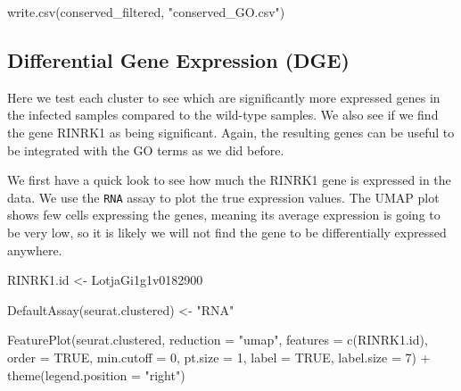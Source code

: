 \documentclass[
  letterpaper,
  DIV=11,
  numbers=noendperiod]{scrartcl}
\newenvironment{Shaded}{\begin{snugshade}}{\end{snugshade}}
\newcommand{\AttributeTok}[1]{\textcolor[rgb]{0.49,0.56,0.16}{#1}}
\newcommand{\ConstantTok}[1]{\textcolor[rgb]{0.53,0.00,0.00}{#1}}
\newcommand{\DecValTok}[1]{\textcolor[rgb]{0.25,0.63,0.44}{#1}}
\newcommand{\FunctionTok}[1]{\textcolor[rgb]{0.02,0.16,0.49}{#1}}
\newcommand{\NormalTok}[1]{\textcolor[rgb]{0.00,0.44,0.13}{#1}}
\newcommand{\OtherTok}[1]{\textcolor[rgb]{0.00,0.44,0.13}{#1}}
\newcommand{\SpecialCharTok}[1]{\textcolor[rgb]{0.25,0.44,0.63}{#1}}
\newcommand{\StringTok}[1]{\textcolor[rgb]{0.25,0.44,0.63}{#1}}
\begin{document}
\begin{Shaded}
\begin{Highlighting}[]
\FunctionTok{write.csv}\NormalTok{(conserved\_filtered, }\StringTok{"conserved\_GO.csv"}\NormalTok{)}
\end{Highlighting}
\end{Shaded}

\hypertarget{differential-gene-expression-dge}{%
\subsection{Differential Gene Expression
(DGE)}\label{differential-gene-expression-dge}}

Here we test each cluster to see which are significantly more expressed
genes in the infected samples compared to the wild-type samples. We also
see if we find the gene RINRK1 as being significant. Again, the
resulting genes can be useful to be integrated with the GO terms as we
did before.

We first have a quick look to see how much the RINRK1 gene is expressed
in the data. We use the \texttt{RNA} assay to plot the true expression
values. The UMAP plot shows few cells expressing the genes, meaning its
average expression is going to be very low, so it is likely we will not
find the gene to be differentially expressed anywhere.

\begin{Shaded}
\begin{Highlighting}[]
\NormalTok{RINRK1.id }\OtherTok{\textless{}{-}} \StringTok{\textquotesingle{}LotjaGi1g1v0182900\textquotesingle{}}

\FunctionTok{DefaultAssay}\NormalTok{(seurat.clustered) }\OtherTok{\textless{}{-}} \StringTok{"RNA"}

\FunctionTok{FeaturePlot}\NormalTok{(seurat.clustered,}
            \AttributeTok{reduction =} \StringTok{"umap"}\NormalTok{, }
            \AttributeTok{features =} \FunctionTok{c}\NormalTok{(RINRK1.id), }
            \AttributeTok{order =} \ConstantTok{TRUE}\NormalTok{,}
            \AttributeTok{min.cutoff =} \DecValTok{0}\NormalTok{, }
            \AttributeTok{pt.size =} \DecValTok{1}\NormalTok{,}
            \AttributeTok{label =} \ConstantTok{TRUE}\NormalTok{,}
            \AttributeTok{label.size =} \DecValTok{7}\NormalTok{) }\SpecialCharTok{+} \FunctionTok{theme}\NormalTok{(}\AttributeTok{legend.position =} \StringTok{"right"}\NormalTok{)}
\end{Highlighting}
\end{Shaded}
\end{document}
